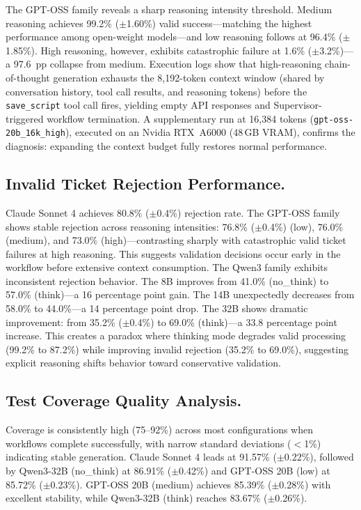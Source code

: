 \documentclass[runningheads]{llncs}
\begin{document}
The GPT-OSS family reveals a sharp reasoning intensity threshold. Medium reasoning achieves 99.2\% ($\pm$1.60\%) valid success---matching the highest performance among open-weight models---and low reasoning follows at 96.4\% ($\pm$1.85\%). High reasoning, however, exhibits catastrophic failure at 1.6\% ($\pm$3.2\%)---a 97.6~pp collapse from medium. Execution logs show that high-reasoning chain-of-thought generation exhausts the 8,192-token context window (shared by conversation history, tool call results, and reasoning tokens) before the \texttt{save\_script} tool call fires, yielding empty API responses and Supervisor-triggered workflow termination. A supplementary run at 16,384 tokens (\texttt{gpt-oss-20b\_16k\_high}), executed on an Nvidia RTX~A6000 (48\,GB VRAM), confirms the diagnosis: expanding the context budget fully restores normal performance.

\subsection{Invalid Ticket Rejection Performance.}
Claude Sonnet 4 achieves 80.8\% ($\pm$0.4\%) rejection rate. The GPT-OSS family shows stable rejection across reasoning intensities: 76.8\% ($\pm$0.4\%) (low), 76.0\% (medium), and 73.0\% (high)---contrasting sharply with catastrophic valid ticket failures at high reasoning. This suggests validation decisions occur early in the workflow before extensive context consumption.
The Qwen3 family exhibits inconsistent rejection behavior. The 8B improves from 41.0\% (no\_think) to 57.0\% (think)---a 16 percentage point gain. The 14B unexpectedly decreases from 58.0\% to 44.0\%---a 14 percentage point drop. The 32B shows dramatic improvement: from 35.2\% ($\pm$0.4\%) to 69.0\% (think)---a 33.8 percentage point increase. This creates a paradox where thinking mode degrades valid processing (99.2\% to 87.2\%) while improving invalid rejection (35.2\% to 69.0\%), suggesting explicit reasoning shifts behavior toward conservative validation.

\subsection{Test Coverage Quality Analysis.}
Coverage is consistently high (75--92\%) across most configurations when workflows complete successfully, with narrow standard deviations ($<$1\%) indicating stable generation. Claude Sonnet 4 leads at 91.57\% ($\pm$0.22\%), followed by Qwen3-32B (no\_think) at 86.91\% ($\pm$0.42\%) and GPT-OSS 20B (low) at 85.72\% ($\pm$0.23\%). GPT-OSS 20B (medium) achieves 85.39\% ($\pm$0.28\%) with excellent stability, while Qwen3-32B (think) reaches 83.67\% ($\pm$0.26\%).
\end{document}
